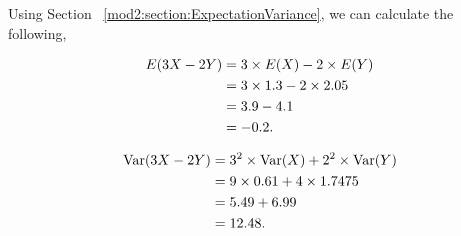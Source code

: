 \begin{subquestions}
\begin{subsubquestions}
\subsubquestion

Using Section ~\ref{mod2:section:ExpectationVariance}, we can calculate the following,

\begin{subsubsubquestions}
	
\subsubsubquestion

\begin{align}
	E(3X-2Y) & = 3 \times E(X) - 2 \times E(Y) \nonumber \\
	         & = 3 \times 1.3 - 2 \times 2.05 \nonumber \\
	         & = 3.9 - 4.1 \nonumber \\
	         & = -0.2.
\end{align}

\subsubsubquestion

\begin{align}
	\text{Var}(3X-2Y) & = 3^2 \times \text{Var}(X) + 2^2 \times \text{Var}(Y) \nonumber \\
	           & = 9 \times 0.61 + 4 \times 1.7475 \nonumber \\
	           & = 5.49 + 6.99 \nonumber \\
	           & = 12.48.
\end{align}

\end{subsubsubquestions}

\end{subsubquestions}

\end{subquestions}


